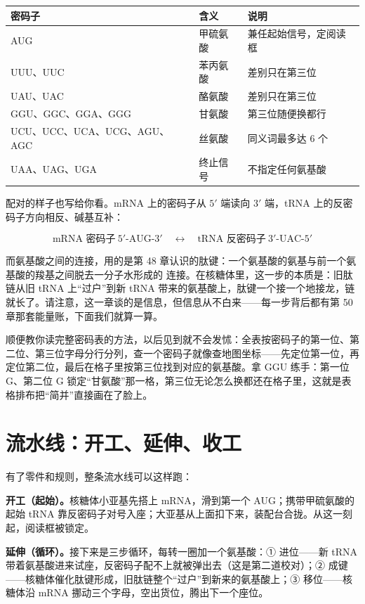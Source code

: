 \begin{table}[htbp]
\centering
\begin{tabular}{lll}
\toprule
密码子 & 含义 & 说明 \\
\midrule
AUG & 甲硫氨酸 & 兼任起始信号，定阅读框 \\
UUU、UUC & 苯丙氨酸 & 差别只在第三位 \\
UAU、UAC & 酪氨酸 & 差别只在第三位 \\
GGU、GGC、GGA、GGG & 甘氨酸 & 第三位随便换都行 \\
UCU、UCC、UCA、UCG、AGU、AGC & 丝氨酸 & 同义词最多达 6 个 \\
UAA、UAG、UGA & 终止信号 & 不指定任何氨基酸 \\
\bottomrule
\end{tabular}
\end{table}

配对的样子也写给你看。mRNA 上的密码子从 $5'$ 端读向 $3'$ 端，tRNA 上的反密码子方向相反、碱基互补：

\[ \text{mRNA 密码子}\ 5'\text{-AUG-}3' \quad \longleftrightarrow \quad \text{tRNA 反密码子}\ 3'\text{-UAC-}5' \]

而氨基酸之间的连接，用的是第 48 章认识的肽键：一个氨基酸的氨基与前一个氨基酸的羧基之间脱去一分子水形成的  连接。在核糖体里，这一步的本质是：旧肽链从旧 tRNA 上“过户”到新 tRNA 带来的氨基酸上，肽键一个接一个地接龙，链就长了。请注意，这一章谈的是信息，但信息从不白来——每一步背后都有第 50 章那套能量账，下面我们就算一算。

顺便教你读完整密码表的方法，以后见到就不会发怵：全表按密码子的第一位、第二位、第三位字母分行分列，查一个密码子就像查地图坐标——先定位第一位，再定位第二位，最后在格子里按第三位找到对应的氨基酸。拿 GGU 练手：第一位 G、第二位 G 锁定“甘氨酸”那一格，第三位无论怎么换都还在格子里，这就是表格排布把“简并”直接画在了脸上。

\section{流水线：开工、延伸、收工}

有了零件和规则，整条流水线可以这样跑：

\textbf{开工（起始）。}核糖体小亚基先搭上 mRNA，滑到第一个 AUG；携带甲硫氨酸的起始 tRNA 靠反密码子对号入座；大亚基从上面扣下来，装配台合拢。从这一刻起，阅读框被锁定。

\textbf{延伸（循环）。}接下来是三步循环，每转一圈加一个氨基酸：① 进位——新 tRNA 带着氨基酸进来试座，反密码子配不上就被弹出去（这是第二道校对）；② 成键——核糖体催化肽键形成，旧肽链整个“过户”到新来的氨基酸上；③ 移位——核糖体沿 mRNA 挪动三个字母，空出货位，腾出下一个座位。

